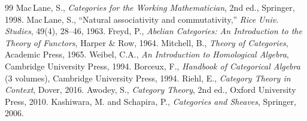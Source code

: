 \documentclass[a4paper,12pt]{book}
\theoremstyle{definition}
\theoremstyle{plain}
\theoremstyle{remark}
\begin{document}

\begin{thebibliography}{99}
 Mac\,Lane, S., \emph{Categories for the Working Mathematician}, 2nd ed., Springer, 1998.
 Mac\,Lane, S., ``Natural associativity and commutativity,'' \emph{Rice Univ. Studies}, 49(4), 28--46, 1963.
 Freyd, P., \emph{Abelian Categories: An Introduction to the Theory of Functors}, Harper \& Row, 1964.
 Mitchell, B., \emph{Theory of Categories}, Academic Press, 1965.
 Weibel, C.A., \emph{An Introduction to Homological Algebra}, Cambridge University Press, 1994.
 Borceux, F., \emph{Handbook of Categorical Algebra} (3 volumes), Cambridge University Press, 1994.
 Riehl, E., \emph{Category Theory in Context}, Dover, 2016.
 Awodey, S., \emph{Category Theory}, 2nd ed., Oxford University Press, 2010.
 Kashiwara, M. and Schapira, P., \emph{Categories and Sheaves}, Springer, 2006.
\end{thebibliography}


\cleardoublepage
{}
{}
\printindex
\end{document}
